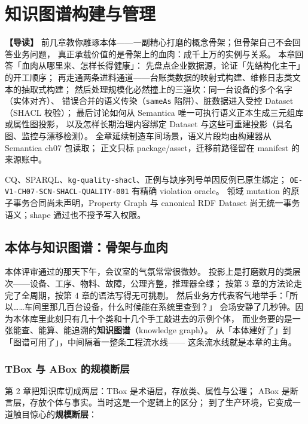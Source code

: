 \chapter{知识图谱构建与管理}

\begin{introbox}
\textbf{【导读】}
前几章教你雕琢本体——一副精心打磨的概念骨架；但骨架自己不会回答业务问题，
真正承载价值的是骨架上的血肉：成千上万的实例与关系。
本章回答「血肉从哪里来、怎样长得健康」：
先盘点企业数据源，论证「先结构化主干」的开工顺序；
再走通两条进料通道——台账类数据的映射式构建、维修日志类文本的抽取式构建；
然后处理规模化必然撞上的三道坎：同一台设备的多个名字（实体对齐）、
错误合并的语义传染（\texttt{sameAs} 陷阱）、脏数据进入受控 Dataset（SHACL 校验）；
最后讨论如何从 Semantica 唯一可执行语义正本生成三元组库或属性图投影，
以及怎样长期治理内容绑定 Dataset 与这些可重建投影（具名图、监控与漂移检测）。
全章延续制造车间场景，语义片段均由构建器从 Semantica ch07 包读取；
正文只标 package/asset，迁移前路径留在 manifest 的来源账中。
\end{introbox}

{CQ、SPARQL、\texttt{kg-quality-shacl}、正例与缺序列号单因反例已原生绑定；
\texttt{OE-V1-CH07-SCN-SHACL-QUALITY-001} 有精确 violation oracle。}
{领域 mutation 的原子事务合同尚未声明，Property Graph 与 canonical RDF Dataset
尚无统一事务语义；shape 通过也不授予写入权限。}

\section{本体与知识图谱：骨架与血肉}

本体评审通过的那天下午，会议室的气氛常常很微妙。
投影上是打磨数月的类层次——设备、工序、物料、故障，公理齐整，推理器全绿；
按第 3 章的方法论走完了全周期，按第 4 章的语法写得无可挑剔。
然后业务方代表客气地举手：「所以……车间里那几百台设备，什么时候能在系统里查到？」
会场安静了几秒钟。因为本体库里此刻只有几十个类和十几个手工敲进去的示例个体，
而业务要的是一张能查、能算、能追溯的\textbf{知识图谱}（knowledge graph）。
从「本体建好了」到「图谱可用了」，中间隔着一整条工程流水线——
这条流水线就是本章的主角。

\subsection{TBox 与 ABox 的规模断层}

第 2 章把知识库切成两层：TBox 是术语层，存放类、属性与公理；
ABox 是断言层，存放个体与事实。当时这是一个逻辑上的区分；
到了生产环境，它变成一道触目惊心的\textbf{规模断层}：

